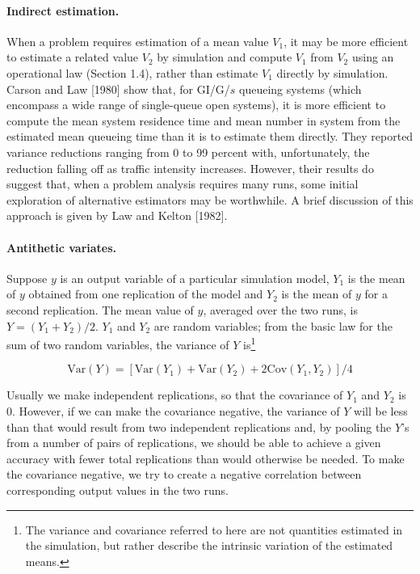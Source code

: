 \paragraph{Indirect estimation.}
When a problem requires estimation of a mean value $V_1$, it may be more
efficient to estimate a related value $V_2$ by simulation and compute $V_1$ from
$V_2$ using an operational law (Section 1.4), rather than estimate $V_1$
directly by simulation. Carson and Law [1980] show that, for GI/G/$s$ queueing
systems (which encompass a wide range of single-queue open systems), it is more
efficient to compute the mean system residence time and mean number in system
from the estimated mean queueing time than it is to estimate them directly.
They reported variance reductions ranging from 0 to 99 percent with,
unfortunately, the reduction falling off as traffic intensity increases.
However, their results do suggest that, when a problem analysis requires many
runs, some initial exploration of alternative estimators may be worthwhile. A
brief discussion of this approach is given by Law and Kelton [1982].

\paragraph{Antithetic variates.}
Suppose $y$ is an output variable of a particular simulation model, $Y_1$ is the
mean of $y$ obtained from one replication of the model and $Y_2$ is the mean of
$y$ for a second replication. The mean value of $y$, averaged over the two runs,
is $Y = (Y_1 + Y_2)/2$. $Y_1$ and $Y_2$ are random variables; from the basic law
for the sum of two random variables, the variance of $Y$ is\footnote{The
variance and covariance referred to here are not quantities estimated in the
simulation, but rather describe the intrinsic variation of the estimated means.}

\begin{equation}
\mathrm{Var}(Y) = [\mathrm{Var}(Y_1) + \mathrm{Var}(Y_2) + 2\mathrm{Cov}(Y_1,Y_2)]/4
\label{eq:output-antithetic}
\end{equation}

Usually we make independent replications, so that the covariance of $Y_1$ and
$Y_2$ is 0. However, if we can make the covariance negative, the variance of $Y$
will be less than that would result from two independent replications and, by
pooling the $Y$'s from a number of pairs of replications, we should be able to
achieve a given accuracy with fewer total replications than would otherwise be
needed. To make the covariance negative, we try to create a negative
correlation between corresponding output values in the two runs.


